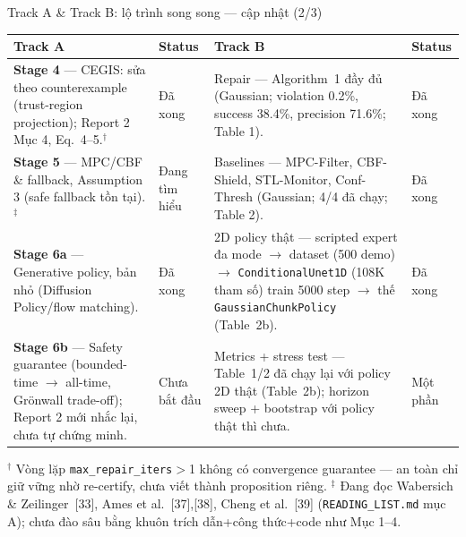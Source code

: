 \documentclass[aspectratio=169]{beamer}
\newcommand{\good}[1]{\textcolor{green!40!black}{#1}}
\newcommand{\wip}[1]{\textcolor{orange!80!black}{#1}}
\begin{document}
\begin{frame}[t,shrink=8]{Track A \& Track B: lộ trình song song --- cập nhật (2/3)}
\footnotesize
\begin{tabularx}{\textwidth}{|>{\raggedright\arraybackslash}p{}|>{\centering\arraybackslash}p{}|>{\raggedright\arraybackslash}p{}|>{\centering\arraybackslash}p{}|}
\hline
\textbf{Track A} & \textbf{Status} & \textbf{Track B} & \textbf{Status} \\
\hline
\textbf{Stage 4} --- CEGIS: sửa theo counterexample (trust-region projection); Report 2 Mục 4, Eq.~4--5.$^\dagger$ &
\good{Đã xong} &
Repair --- Algorithm~1 đầy đủ (Gaussian; violation 0.2\%, success 38.4\%, precision 71.6\%; Table 1). &
\good{Đã xong} \\
\hline
\textbf{Stage 5} --- MPC/CBF \& fallback, Assumption 3 (safe fallback tồn tại).$^\ddagger$ &
\wip{Đang tìm hiểu} &
Baselines --- MPC-Filter, CBF-Shield, STL-Monitor, Conf-Thresh (Gaussian; 4/4 đã chạy; Table 2). &
\good{Đã xong} \\
\hline
\textbf{Stage 6a} --- Generative policy, bản nhỏ (Diffusion Policy/flow matching). &
\good{Đã xong} &
2D policy thật --- scripted expert đa mode $\to$ dataset (500 demo) $\to$ \texttt{ConditionalUnet1D} (108K tham số) train 5000 step $\to$ thế \texttt{GaussianChunkPolicy} (Table~2b). &
\good{Đã xong} \\
\hline
\textbf{Stage 6b} --- Safety guarantee (bounded-time $\to$ all-time, Grönwall trade-off); Report 2 mới nhắc lại, chưa tự chứng minh. &
Chưa bắt đầu &
Metrics + stress test --- Table~1/2 đã \good{chạy lại với policy 2D thật} (Table~2b); horizon sweep + bootstrap với policy thật thì \wip{chưa}. &
\wip{Một phần} \\
\hline
\end{tabularx}
\vspace{4pt}
{\scriptsize $^\dagger$ Vòng lặp \texttt{max\_repair\_iters}$>$1 không có convergence guarantee --- an toàn chỉ giữ vững nhờ re-certify, chưa viết thành proposition riêng. $^\ddagger$ Đang đọc Wabersich \& Zeilinger~[33], Ames et al.~[37],[38], Cheng et al.~[39] (\texttt{READING\_LIST.md} mục A); chưa đào sâu bằng khuôn trích dẫn+công thức+code như Mục 1--4.}
\end{frame}
\end{document}
